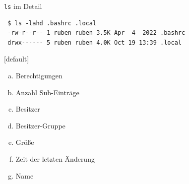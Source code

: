 \documentclass[compress]{beamer}
\begin{document}
\begin{frame}[fragile]{\texttt{ls} im Detail}
\begin{verbatim}
 $ ls -lahd .bashrc .local
 -rw-r--r-- 1 ruben ruben 3.5K Apr  4  2022 .bashrc
 drwx------ 5 ruben ruben 4.0K Oct 19 13:39 .local
\end{verbatim}

\hspace*{0.2mm}
{
[default]
\begin{enumerate}[a)]
\item Berechtigungen
\item Anzahl Sub-Einträge
\item Besitzer
\item Besitzer-Gruppe
\item Größe
\item Zeit der letzten Änderung
\item Name
\end{enumerate}
}

\end{frame}
\end{document}
